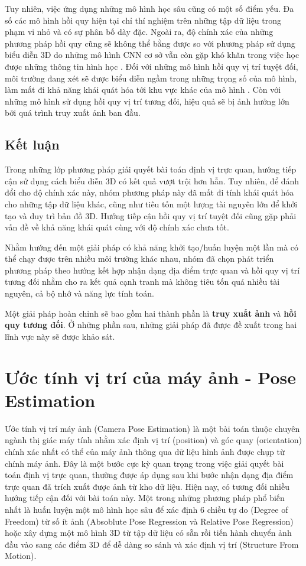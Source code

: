 Tuy nhiên, việc ứng dụng những mô hình học sâu cũng có một số điểm yếu. Đa số các mô hình hồi quy hiện tại chỉ thí nghiệm trên những tập dữ liệu trong phạm vi nhỏ và có sự phân bố dày đặc. Ngoài ra, độ chính xác của những phương pháp hồi quy cũng sẽ không thể bằng được so với phương pháp sử dụng biểu diễn 3D do những mô hình CNN cơ sở vẫn còn gặp khó khăn trong việc học được những thông tin hình học \cite{zhou2020learn}. Đối với những mô hình hồi quy vị trí tuyệt đối, môi trường đang xét sẽ được biểu diễn ngầm trong những trọng số của mô hình, làm mất đi khả năng khái quát hóa tới khu vực khác của mô hình \cite{sattler2019understanding}. Còn với những mô hình sử dụng hồi quy vị trí tương đối, hiệu quả sẽ bị ảnh hưởng lớn bởi quá trình truy xuất ảnh ban đầu.

\subsection{Kết luận}
Trong những lớp phương pháp giải quyết bài toán định vị trực quan, hướng tiếp cận sử dụng cách biểu diễn 3D có kết quả vượt trội hơn hẳn. Tuy nhiên, để đánh đổi cho độ chính xác này, nhóm phương pháp này đã mất đi tính khái quát hóa cho những tập dữ liệu khác, cũng như tiêu tốn một lượng tài nguyên lớn để khởi tạo và duy trì bản đồ 3D. Hướng tiếp cận hồi quy vị trí tuyệt đối cũng gặp phải vấn đề về khả năng khái quát cùng với độ chính xác chưa tốt.

Nhằm hướng đến một giải pháp có khả năng khởi tạo/huấn luyện một lần mà có thể chạy được trên nhiều môi trường khác nhau, nhóm đã chọn phát triển phương pháp theo hướng kết hợp nhận dạng địa điểm trực quan và hồi quy vị trí tương đối nhằm cho ra kết quả cạnh tranh mà không tiêu tốn quá nhiều tài nguyên, cả bộ nhớ và năng lực tính toán.

Một giải pháp hoàn chỉnh sẽ bao gồm hai thành phần là \textbf{truy xuất ảnh} và \textbf{hồi quy tương đối}. Ở những phần sau, những giải pháp đã được đề xuất trong hai lĩnh vực này sẽ được khảo sát.




\section{Ước tính vị trí của máy ảnh - Pose Estimation}

Ước tính vị trí máy ảnh (Camera Pose Estimation) là một bài toán thuộc chuyên ngành thị giác máy tính nhằm xác định vị trí (position) và góc quay (orientation) chính xác nhất có thể của máy ảnh thông qua dữ liệu hình ảnh được chụp từ chính máy ảnh. Đây là một bước cực kỳ quan trọng trong việc giải quyết bài toán định vị trực quan, thường được áp dụng sau khi bước nhận dạng địa điểm trực quan đã trích xuất được ảnh từ kho dữ liệu. Hiện nay, có tương đối nhiều hướng tiếp cận đối với bài toán này. Một trong những phương pháp phổ biến nhất là huấn luyện một mô hình học sâu để xác định 6 chiều tự do (Degree of Freedom) từ số ít ảnh (Absoblute Pose Regression và Relative Pose Regression) hoặc xây dựng một mô hình 3D từ tập dữ liệu có sẵn rồi tiến hành chuyển ảnh đầu vào sang các điểm 3D để dễ dàng so sánh và xác định vị trí (Structure From Motion).

